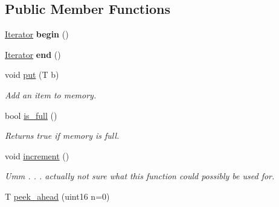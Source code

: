 \subsection*{Public Member Functions}
\begin{DoxyCompactItemize}
\item 
\hypertarget{classetk_1_1_short_term_memory_a2a2d18853489aaa9f4462b73109a5441}{\hyperlink{classetk_1_1_short_term_memory_1_1_iterator}{Iterator} {\bfseries begin} ()}\label{classetk_1_1_short_term_memory_a2a2d18853489aaa9f4462b73109a5441}

\item 
\hypertarget{classetk_1_1_short_term_memory_acf6db78d7b713ea53bc12ede90018ee5}{\hyperlink{classetk_1_1_short_term_memory_1_1_iterator}{Iterator} {\bfseries end} ()}\label{classetk_1_1_short_term_memory_acf6db78d7b713ea53bc12ede90018ee5}

\item 
\hypertarget{classetk_1_1_short_term_memory_a960b35e4870eba7f21446816b0762357}{void \hyperlink{classetk_1_1_short_term_memory_a960b35e4870eba7f21446816b0762357}{put} (T b)}\label{classetk_1_1_short_term_memory_a960b35e4870eba7f21446816b0762357}

\begin{DoxyCompactList}\small\item\em Add an item to memory. \end{DoxyCompactList}\item 
\hypertarget{classetk_1_1_short_term_memory_a1f4bb161b90b3afefb5ed3906cafceb0}{bool \hyperlink{classetk_1_1_short_term_memory_a1f4bb161b90b3afefb5ed3906cafceb0}{is\-\_\-full} ()}\label{classetk_1_1_short_term_memory_a1f4bb161b90b3afefb5ed3906cafceb0}

\begin{DoxyCompactList}\small\item\em Returns true if memory is full. \end{DoxyCompactList}\item 
\hypertarget{classetk_1_1_short_term_memory_adb7d21b91f38eaee4da9be13b4eaf5f9}{void \hyperlink{classetk_1_1_short_term_memory_adb7d21b91f38eaee4da9be13b4eaf5f9}{increment} ()}\label{classetk_1_1_short_term_memory_adb7d21b91f38eaee4da9be13b4eaf5f9}

\begin{DoxyCompactList}\small\item\em Umm . . . actually not sure what this function could possibly be used for. \end{DoxyCompactList}\item 
\hypertarget{classetk_1_1_short_term_memory_a65be8def78928c4fabf56ee1f612f782}{T \hyperlink{classetk_1_1_short_term_memory_a65be8def78928c4fabf56ee1f612f782}{peek\-\_\-ahead} (uint16 n=0)}\label{classetk_1_1_short_term_memory_a65be8def78928c4fabf56ee1f612f782}


\end{DoxyCompactItemize}
